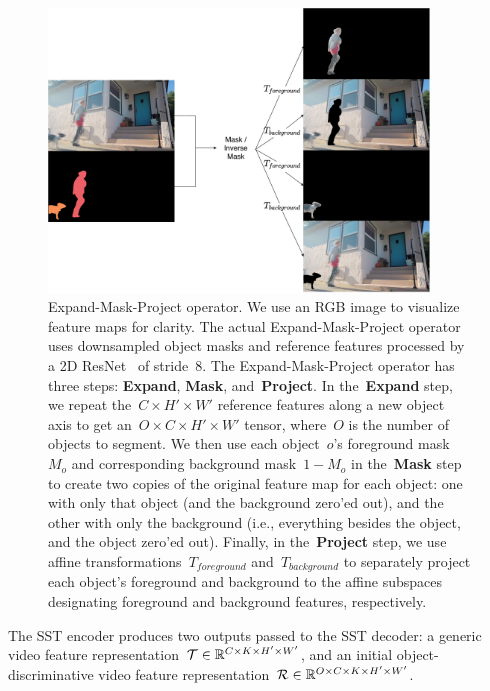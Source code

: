 \begin{figure}
\centering
\includegraphics[width=0.9\textwidth]{Figures/expand-mask-project.pdf}
\caption{Expand-Mask-Project operator.
         We use an RGB image to visualize feature maps for clarity.
         The actual Expand-Mask-Project operator uses downsampled object masks
         and reference features processed by a 2D ResNet~\citep{he2016deep} of
         stride~\num{8}.
         The Expand-Mask-Project operator has three steps: \textbf{Expand},
         \textbf{Mask}, and~\textbf{Project}.
         In the~\textbf{Expand} step, we repeat the~$C\times H'\times W'$
         reference features along a new object axis to get
         an~$O\times C\times H'\times W'$ tensor, where~$O$ is the number of
         objects to segment.
         We then use each object~$o$'s foreground mask~$M_o$ and corresponding
         background mask~$1 - M_o$ in the~\textbf{Mask} step to create two
         copies of the original feature map for each object: one with only that
         object (and the background zero'ed out), and the other with only the
         background (i.e., everything besides the object, and the object
         zero'ed out).
         Finally, in the~\textbf{Project} step, we use affine
         transformations~$T_{foreground}$ and~$T_{background}$ to separately
         project each object's foreground and background to the affine
         subspaces designating foreground and background features,
         respectively.}
\label{fig:expandmaskproject}
\end{figure}

The SST encoder produces two outputs passed to the SST decoder: a generic video
feature representation~$\mathcal{T}{}\in\mathbb{R}{}^{C\times K \times H'\times W'}$,
and an initial object-discriminative video feature
representation~$\mathcal{R}{}\in\mathbb{R}{}^{O\times C\times K \times H'\times W'}$.

